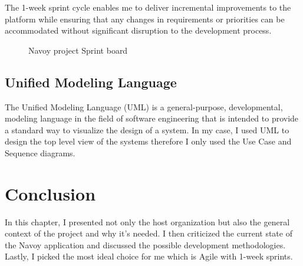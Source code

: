 The 1-week sprint cycle enables me to deliver incremental improvements to the platform while ensuring that any changes in requirements or priorities can be accommodated without significant disruption to the development process.

\begin{figure}[H]
  \centering
  \caption{Navoy project Sprint board}
  \label{fig:navoy-project-sprint-board}
\end{figure}

\subsection{Unified Modeling Language}
The Unified Modeling Language (UML) is a general-purpose, developmental, modeling language in the field of software engineering that is intended to provide a standard way to visualize the design of a system. In my case, I used UML to design the top level view of the systems therefore I only used the Use Case and Sequence diagrams.

\setcounter{secnumdepth}{0} %
\section{Conclusion}
In this chapter, I presented not only the host organization but also the general context of the project and why it's needed.
I then criticized the current state of the Navoy application and discussed the possible development methodologies.
Lastly, I picked the most ideal choice for me which is Agile with 1-week sprints.

